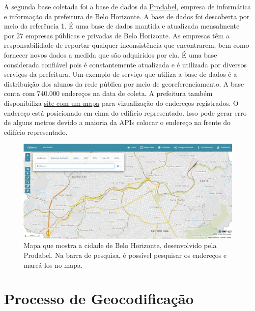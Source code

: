 A segunda base coletada foi a base de dados da \href{https://prefeitura.pbh.gov.br/prodabel}{Prodabel}, empresa de informática e informação da prefeitura de Belo Horizonte. A base de dados foi descoberta por meio da referência 1. É uma base de dados mantida e atualizada mensalmente por 27 empresas públicas e privadas de Belo Horizonte. As empresas têm a responsabilidade de reportar qualquer inconsistência que encontrarem, bem como fornecer novos dados a medida que são adquiridos por ela. É uma base considerada confiável pois é constantemente atualizada e é utilizada por diversos serviços da prefeitura. Um exemplo de serviço que utiliza a base de dados é a distribuição dos alunos da rede pública por meio de georeferenciamento. A base conta com 740.000 endereços na data de coleta. A prefeitura também disponibiliza \href{https://bhmap.pbh.gov.br}{site com um mapa} para vizualização do endereços registrados. O endereço está posicionado em cima do edifício representado. Isso pode gerar erro de alguns metros devido a maioria da APIs colocar o endereço na frente do edifício representado. 

\begin{figure}
    \centering
    \includegraphics[width=\textwidth]{Figuras/siteProdabel.jpeg}
    \caption{Mapa que mostra a cidade de Belo Horizonte, desenvolvido pela Prodabel. Na barra de pesquisa, é possível pesquisar os endereços e marcá-los no mapa.}
    \label{fig:siteProdabel}
\end{figure}


\section{Processo de Geocodificação}

